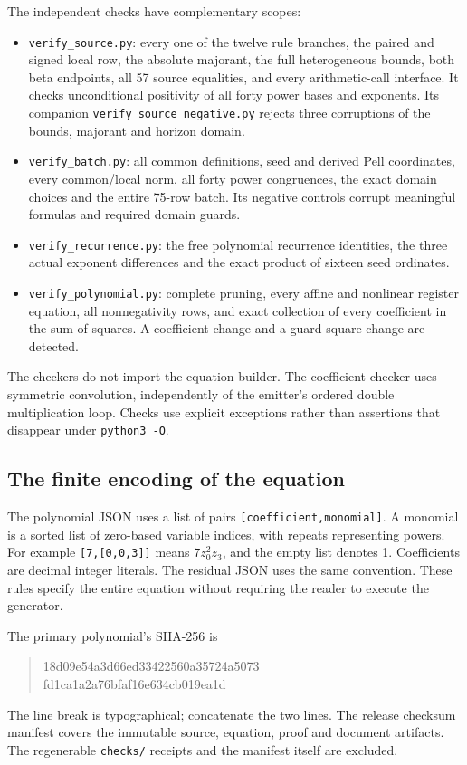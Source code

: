 \documentclass[11pt]{article}
\theoremstyle{definition}
\theoremstyle{remark}
\newcommand{\File}[1]{\nolinkurl{#1}}
\begin{document}
The independent checks have complementary scopes:
\begin{itemize}
\item \File{verify_source.py}: every one of the twelve rule branches,
the paired and signed local row, the absolute majorant, the full
heterogeneous bounds, both beta endpoints, all 57 source equalities,
and every arithmetic-call interface. It checks unconditional positivity
of all forty power bases and exponents. Its companion
\File{verify_source_negative.py} rejects three corruptions of the
bounds, majorant and horizon domain.
\item \File{verify_batch.py}: all common definitions, seed and derived
Pell coordinates, every common/local norm, all forty power congruences,
the exact domain choices and the entire 75-row batch. Its negative
controls corrupt meaningful formulas and required domain guards.
\item \File{verify_recurrence.py}: the free polynomial recurrence
identities, the three actual exponent differences and the exact product
of sixteen seed ordinates.
\item \File{verify_polynomial.py}: complete pruning, every affine and
nonlinear register equation, all nonnegativity rows, and exact
collection of every coefficient in the sum of squares. A coefficient
change and a guard-square change are detected.
\end{itemize}

The checkers do not import the equation builder. The coefficient checker
uses symmetric convolution, independently of the emitter's ordered
double multiplication loop. Checks use explicit exceptions rather than
assertions that disappear under \texttt{python3 -O}.

\subsection{The finite encoding of the equation}
The polynomial JSON uses a list of pairs \File{[coefficient,monomial]}.
A monomial is a sorted list of zero-based variable indices, with repeats
representing powers. For example \File{[7,[0,0,3]]} means $7z_0^2z_3$,
and the empty list denotes 1. Coefficients are decimal integer literals.
The residual JSON uses the same convention. These rules specify the
entire equation without requiring the reader to execute the generator.

The primary polynomial's SHA-256 is
\begin{quote}\small\ttfamily
18d09e54a3d66ed33422560a35724a5073\\
fd1ca1a2a76bfaf16e634cb019ea1d
\end{quote}
The line break is typographical; concatenate the two lines.
The release checksum manifest covers the immutable source, equation,
proof and document artifacts. The regenerable \File{checks/} receipts
and the manifest itself are excluded.
\end{document}
